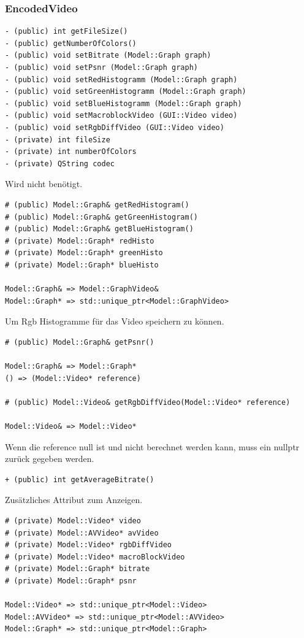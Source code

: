 \documentclass{scrartcl}
\begin{document}
{\subsubsection{EncodedVideo}
\bigskip
\begin{verbatim}
- (public) int getFileSize()
- (public) getNumberOfColors()
- (public) void setBitrate (Model::Graph graph)
- (public) void setPsnr (Model::Graph graph)
- (public) void setRedHistogramm (Model::Graph graph)
- (public) void setGreenHistogramm (Model::Graph graph)
- (public) void setBlueHistogramm (Model::Graph graph)
- (public) void setMacroblockVideo (GUI::Video video)
- (public) void setRgbDiffVideo (GUI::Video video)
- (private) int fileSize
- (private) int numberOfColors
- (private) QString codec
\end{verbatim}
Wird nicht benötigt.
\bigskip
\begin{verbatim}
# (public) Model::Graph& getRedHistogram()
# (public) Model::Graph& getGreenHistogram()
# (public) Model::Graph& getBlueHistogram()
# (private) Model::Graph* redHisto
# (private) Model::Graph* greenHisto
# (private) Model::Graph* blueHisto

Model::Graph& => Model::GraphVideo&
Model::Graph* => std::unique_ptr<Model::GraphVideo>
\end{verbatim}
Um Rgb Histogramme für das Video speichern zu können.
\bigskip
\begin{verbatim}
# (public) Model::Graph& getPsnr()

Model::Graph& => Model::Graph*
() => (Model::Video* reference)

# (public) Model::Video& getRgbDiffVideo(Model::Video* reference)

Model::Video& => Model::Video*
\end{verbatim}
Wenn die reference null ist und nicht berechnet werden kann, muss ein nullptr zurück gegeben werden.
\bigskip
\begin{verbatim}
+ (public) int getAverageBitrate()
\end{verbatim}
Zusätzliches Attribut zum Anzeigen.
\newpage
\begin{verbatim}
# (private) Model::Video* video
# (private) Model::AVVideo* avVideo
# (private) Model::Video* rgbDiffVideo
# (private) Model::Video* macroBlockVideo
# (private) Model::Graph* bitrate
# (private) Model::Graph* psnr

Model::Video* => std::unique_ptr<Model::Video>
Model::AVVideo* => std::unique_ptr<Model::AVVideo>
Model::Graph* => std::unique_ptr<Model::Graph>


\end{verbatim}}
\end{document}
